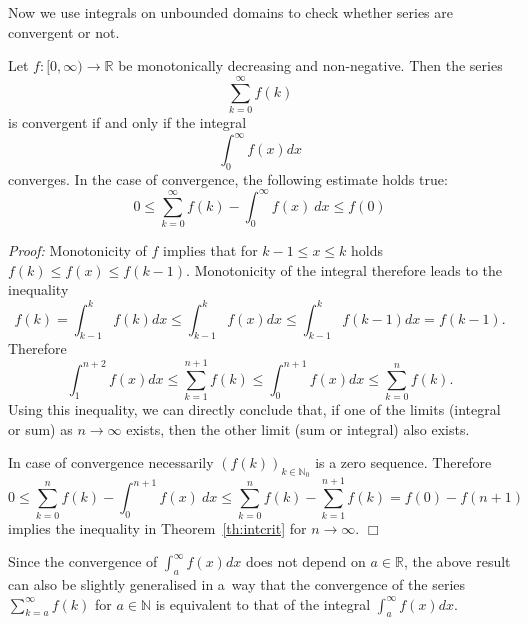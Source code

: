 

Now we use integrals on unbounded domains to check whether series are convergent or not.
\begin{Theorem} \label{th:intcrit} 
Let $f:[0,\infty)\to\mathbb{R}$ be monotonically decreasing and non-negative. Then the series
\[\sum_{k=0}^{\infty}f(k)\]
is convergent if and only if the integral
\[\int_{0}^{\infty}f(x)dx\]
converges.
In the case of convergence, the following estimate holds true:
\begin{equation}
	0\leq \sum_{k=0}^\infty f(k) -\int_0^\infty f(x)~dx\leq f(0)
\end{equation}
\end{Theorem}
{\em Proof:} Monotonicity of $f$ implies that for $k-1\leq x\leq k$ holds $f(k)\leq f(x)\leq f(k-1)$. Monotonicity of the integral therefore leads to the inequality
\[f(k)=\int_{k-1}^kf(k)dx\leq \int_{k-1}^kf(x)dx\leq \int_{k-1}^kf(k-1)dx=f(k-1).\]
Therefore
\[\int_1^{n+2}f(x)dx\leq\sum_{k=1}^{n+1} f(k)\leq \int_0^{n+1}f(x)dx\leq \sum_{k=0}^{n} f(k).\]
Using this inequality, we can directly conclude that, if one of the limits (integral or sum) as $n\to\infty$ exists, then the other limit (sum or integral) also exists.

In case of convergence necessarily $(f(k))_{k\in\mathbb{N}_0}$ is a zero sequence. Therefore
\[0\leq \sum_{k=0}^n f(k) -\int_0^{n+1} f(x)~dx\leq \sum_{k=0}^n f(k) - \sum_{k=1}^{n+1}f(k) =f(0)-f(n+1)\]
implies the inequality in Theorem~\ref{th:intcrit} for $n\rightarrow \infty$.
$\Box$

\begin{Remark}{}
Since the convergence of $\int_{a}^{\infty}f(x)dx$ does not depend on $a\in\mathbb{R}$, the above result can also be slightly generalised in a~way that
the convergence of the series $\sum_{k=a}^{\infty}f(k)$ for $a\in\mathbb{N}$ is equivalent to that of the integral $\int_{a}^{\infty}f(x)dx$.
\end{Remark}

